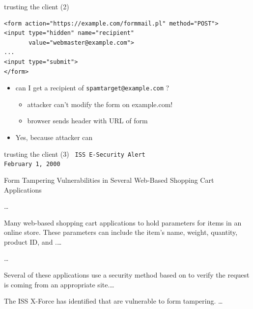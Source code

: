 \begin{frame}[fragile,label=trustCli2]{trusting the client (2)}
\begin{verbatim}
<form action="https://example.com/formmail.pl" method="POST">
<input type="hidden" name="recipient"
       value="webmaster@example.com">
...
<input type="submit">
</form>
\end{verbatim}
    \begin{itemize}
    \item can I get a recipient of \texttt{spamtarget@example.com} ?
        \begin{itemize}
        \item attacker can't modify the form on example.com!
        \item browser sends header with URL of form
        \end{itemize}
    \item<2> Yes, because attacker can 
    \end{itemize}
\end{frame}

\begin{frame}[fragile,label=trustCliNoOne]{trusting the client (3)}
\setlength{\parskip}{0em}
\fontsize{10}{11}\selectfont\tt
ISS E-Security Alert  \\
February 1, 2000 

Form Tampering Vulnerabilities in Several Web-Based Shopping Cart Applications

\ldots

Many web-based shopping cart applications  to
hold parameters for items in an online store. These parameters can include
the item's name, weight, quantity, product ID, and .\ldots

\ldots

Several of these applications use a security method based on 
to verify the request is coming from an appropriate site.\ldots

The ISS X-Force has identified  that are vulnerable to form tampering. \ldots

~
\end{frame}



